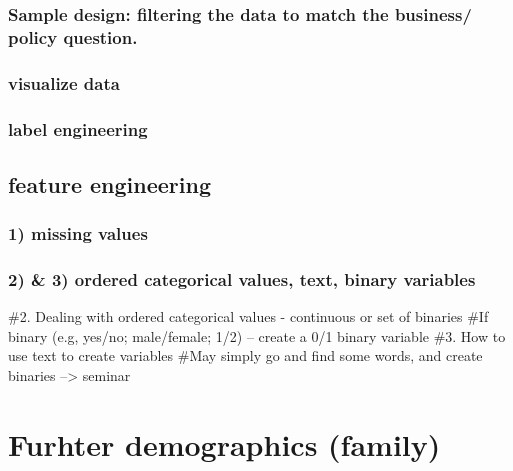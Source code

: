 \documentclass[
]{article}
\begin{document}
\hypertarget{sample-design-filtering-the-data-to-match-the-business-policy-question.}{%
\subsubsection{Sample design: filtering the data to match the business/
policy
question.}\label{sample-design-filtering-the-data-to-match-the-business-policy-question.}}

\hypertarget{visualize-data}{%
\subsubsection{visualize data}\label{visualize-data}}

\hypertarget{label-engineering}{%
\subsubsection{label engineering}\label{label-engineering}}

\hypertarget{feature-engineering}{%
\subsection{feature engineering}\label{feature-engineering}}

\hypertarget{missing-values}{%
\subsubsection{1) missing values}\label{missing-values}}

\hypertarget{ordered-categorical-values-text-binary-variables}{%
\subsubsection{2) \& 3) ordered categorical values, text, binary
variables}\label{ordered-categorical-values-text-binary-variables}}

\#2. Dealing with ordered categorical values - continuous or set of
binaries \#If binary (e.g, yes/no; male/female; 1/2) -- create a 0/1
binary variable \#3. How to use text to create variables \#May simply go
and find some words, and create binaries --\textgreater{} seminar

\hypertarget{furhter-demographics-family}{%
\section{Furhter demographics
(family)}\label{furhter-demographics-family}}
\end{document}

